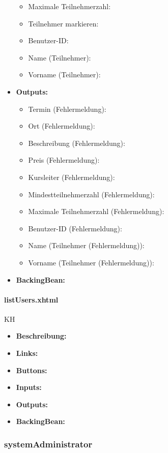 \begin{itemize}
\begin{itemize}
								\item Maximale Teilnehmerzahl:
								\item Teilnehmer markieren:
								\item Benutzer-ID:
								\item Name (Teilnehmer):
								\item Vorname (Teilnehmer):
							\end{itemize}
						\item \textbf{Outputs:}
							\begin{itemize}
								\item Termin (Fehlermeldung):
								\item Ort (Fehlermeldung):
								\item Beschreibung (Fehlermeldung):
								\item Preis (Fehlermeldung):
								\item Kursleiter (Fehlermeldung):
								\item Mindestteilnehmerzahl (Fehlermeldung):
								\item Maximale Teilnehmerzahl (Fehlermeldung):
								\item Benutzer-ID (Fehlermeldung):
								\item Name (Teilnehmer (Fehlermeldung)):
								\item Vorname (Teilnehmer (Fehlermeldung)):
							\end{itemize}
						\item \textbf{BackingBean:}
					\end{itemize}
				
				\paragraph{listUsers.xhtml}
					KH\\
					\begin{itemize}
						\item \textbf{Beschreibung:}
						\item \textbf{Links:}
						\item \textbf{Buttons:}
						\item \textbf{Inputs:}
						\item \textbf{Outputs:}
						\item \textbf{BackingBean:}
					\end{itemize}
			
			\subsubsection{systemAdministrator}
			
